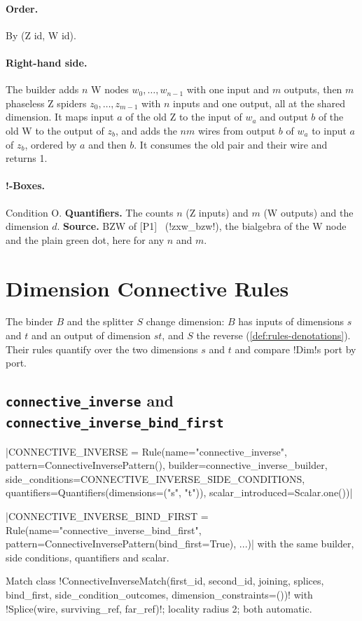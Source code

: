 \paragraph{Order.} By (Z id, W id).

\paragraph{Right-hand side.} The builder adds $n$ W nodes $w_0,\dots,w_{n-1}$ with one input and $m$ outputs, then $m$ phaseless Z spiders $z_0,\dots,z_{m-1}$ with $n$ inputs and one output, all at the shared dimension. It maps input $a$ of the old Z to the input of $w_a$ and output $b$ of the old W to the output of $z_b$, and adds the $nm$ wires from output $b$ of $w_a$ to input $a$ of $z_b$, ordered by $a$ and then $b$. It consumes the old pair and their wire and returns 1.

\paragraph{!-Boxes.} Condition O. \textbf{Quantifiers.} The counts $n$ (Z inputs) and $m$ (W outputs) and the dimension $d$. \textbf{Source.} BZW of [P1]~\cite{poor2023zxw} (\py!zxw_bzw!), the bialgebra of the W node and the plain green dot, here for any $n$ and $m$.

\section{Dimension Connective Rules}\label{sec:rules-connectives}

The binder $B$ and the splitter $S$ change dimension: $B$ has inputs of dimensions $s$ and $t$ and an output of dimension $st$, and $S$ the reverse (\cref{def:rules-denotations}). Their rules quantify over the two dimensions $s$ and $t$ and compare \py!Dim!s port by port.

\subsection{\texttt{connective\_inverse} and \texttt{connective\_inverse\_bind\_first}}\label{sec:rules-connective-inverse}

\begin{signature}
\py|CONNECTIVE_INVERSE = Rule(name="connective_inverse", pattern=ConnectiveInversePattern(), builder=connective_inverse_builder, side_conditions=CONNECTIVE_INVERSE_SIDE_CONDITIONS, quantifiers=Quantifiers(dimensions=("s", "t")), scalar_introduced=Scalar.one())|

\py|CONNECTIVE_INVERSE_BIND_FIRST = Rule(name="connective_inverse_bind_first", pattern=ConnectiveInversePattern(bind_first=True), ...)| with the same builder, side conditions, quantifiers and scalar.

Match class \py!ConnectiveInverseMatch(first_id, second_id, joining, splices, bind_first, side_condition_outcomes, dimension_constraints=())! with \py!Splice(wire, surviving_ref, far_ref)!; locality radius 2; both automatic.
\end{signature}

